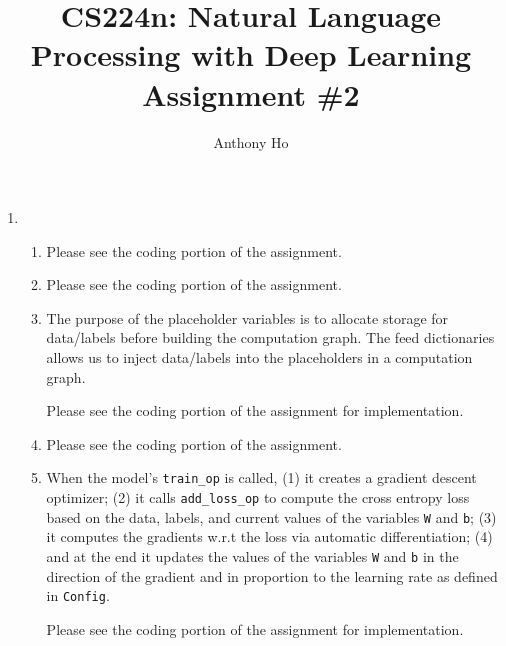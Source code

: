 \documentclass[10pt,reqno]{amsart}
\begin{document}
\title{CS224n: Natural Language Processing with Deep Learning\\Assignment \#2}
\author{Anthony Ho}
\maketitle


\newcommand{\f}{\frac}
\newcommand{\pd}[1]{\frac{\partial}{\partial #1}}
\newcommand{\pdd}[2]{\frac{\partial #1}{\partial #2}}
\newcommand{\softmax}{\text{softmax}}


\renewcommand{\labelenumi}{\arabic{enumi}.}
\begin{enumerate}[topsep=0pt,itemsep=3ex,partopsep=1ex,parsep=1ex]


\item
  \begin{enumerate}[itemsep=2ex]
  \item Please see the coding portion of the assignment.
  \item Please see the coding portion of the assignment.
  \item
    The purpose of the placeholder variables is to allocate storage for data/labels 
    before building the computation graph. The feed dictionaries allows us to inject 
    data/labels into the placeholders in a computation graph. 

    Please see the coding portion of the assignment for implementation. 
  \item Please see the coding portion of the assignment.
  \item 
    When the model's \texttt{train\_op} is called, 
    (1) it creates a gradient descent optimizer;
    (2) it calls \texttt{add\_loss\_op} to compute the cross entropy loss based on 
    the data, labels, and current values of the variables \texttt{W} and \texttt{b};
    (3) it computes the gradients w.r.t the loss via automatic differentiation;
    (4) and at the end it updates the values of the variables \texttt{W} and \texttt{b} in the direction
    of the gradient and in proportion to the learning rate as defined in \texttt{Config}.
    
    Please see the coding portion of the assignment for implementation. 
  \end{enumerate}



\end{enumerate}
\end{document}
